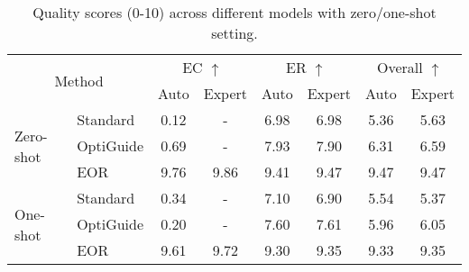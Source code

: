 \begin{table*}[ht]
\caption{Quality scores (0-10) across different models with zero/one-shot setting.}
\label{tab:explanations}
\vspace{-8pt}
\begin{center}
\begin{tabular}{ll|cc|cc|cc}
\toprule
\multicolumn{2}{c}{\multirow{2}{*}{Method}} & \multicolumn{2}{c|}{EC $\uparrow$} & \multicolumn{2}{c|}{ER $\uparrow$} & \multicolumn{2}{c}{Overall $\uparrow$} \\
\cmidrule{3-8}
\multicolumn{2}{c}{} & Auto & \cellcolor{gray!20} Expert & Auto & \cellcolor{gray!20} Expert & Auto & \cellcolor{gray!20} Expert \\
\midrule
\multicolumn{1}{l|}{\multirow{3}{*}{Zero-shot}} & Standard & 0.12 & \cellcolor{gray!20} - & 6.98 & \cellcolor{gray!20} 6.98 & 5.36 & \cellcolor{gray!20} 5.63  \\
\multicolumn{1}{c|}{} & OptiGuide & 0.69 & \cellcolor{gray!20} - & 7.93 & \cellcolor{gray!20} 7.90 & 6.31 & \cellcolor{gray!20} 6.59  \\
\multicolumn{1}{c|}{} & EOR & 9.76 & \cellcolor{gray!20} 9.86 & 9.41 & \cellcolor{gray!20} 9.47 & 9.47 & \cellcolor{gray!20} 9.47 \\
\midrule
\multicolumn{1}{l|}{\multirow{3}{*}{One-shot}} & Standard & 0.34 & \cellcolor{gray!20} - & 7.10 & \cellcolor{gray!20} 6.90 & 5.54 & \cellcolor{gray!20} 5.37  \\
\multicolumn{1}{c|}{} & OptiGuide & 0.20 & \cellcolor{gray!20} - & 7.60 & \cellcolor{gray!20} 7.61 & 5.96 & \cellcolor{gray!20} 6.05  \\
\multicolumn{1}{c|}{} & EOR & 9.61 & \cellcolor{gray!20} 9.72 & 9.30 & \cellcolor{gray!20} 9.35 & 9.33 & \cellcolor{gray!20} 9.35  \\
\bottomrule
\end{tabular}
\end{center}
\end{table*}
